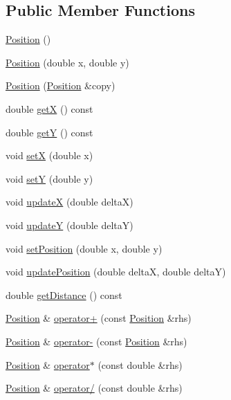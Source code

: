 \subsection*{Public Member Functions}
\begin{DoxyCompactItemize}
\item 
\hyperlink{class_position_a369a577425f8ba02e8750d04b6a088db}{Position} ()
\item 
\hyperlink{class_position_a0035b8b376e447f5f8553dbe779a6693}{Position} (double x, double y)
\item 
\hyperlink{class_position_aba89a35414709930522f5141b282a9d0}{Position} (\hyperlink{class_position}{Position} \&copy)
\item 
double \hyperlink{class_position_a8f56d751e61f566edc86c8204c375627}{getX} () const 
\item 
double \hyperlink{class_position_a41227de88089c740795e0630a6ecfcd6}{getY} () const 
\item 
void \hyperlink{class_position_af12bdfae6a9ccecfc31d968de3613a1d}{setX} (double x)
\item 
void \hyperlink{class_position_a5fbae78d4986da56edad357a82e1e376}{setY} (double y)
\item 
void \hyperlink{class_position_a56c3ae5605a8b87a65c4510087f04b07}{updateX} (double deltaX)
\item 
void \hyperlink{class_position_a80d0e169ab08d5eb0be56a11399d702e}{updateY} (double deltaY)
\item 
void \hyperlink{class_position_a24bf648ecd030785cb52b8f40da19564}{set\+Position} (double x, double y)
\item 
void \hyperlink{class_position_a7d42091f483e6e5053f5142c76f8fdab}{update\+Position} (double deltaX, double deltaY)
\item 
double \hyperlink{class_position_a7095f5218689d457a903e7e4c73c5447}{get\+Distance} () const 
\item 
\hyperlink{class_position}{Position} \& \hyperlink{class_position_a1c2dca054c1d38e10ff2cb2c85aac9c1}{operator+} (const \hyperlink{class_position}{Position} \&rhs)
\item 
\hyperlink{class_position}{Position} \& \hyperlink{class_position_a9545a9c4427212df6b9eedcf22c1ab5d}{operator-\/} (const \hyperlink{class_position}{Position} \&rhs)
\item 
\hyperlink{class_position}{Position} \& \hyperlink{class_position_a73eb4658ce3356c4d83a50ad22413a21}{operator$\ast$} (const double \&rhs)
\item 
\hyperlink{class_position}{Position} \& \hyperlink{class_position_a268d94e221b0b9709ff7e9cc303fdbcd}{operator/} (const double \&rhs)

\end{DoxyCompactItemize}
